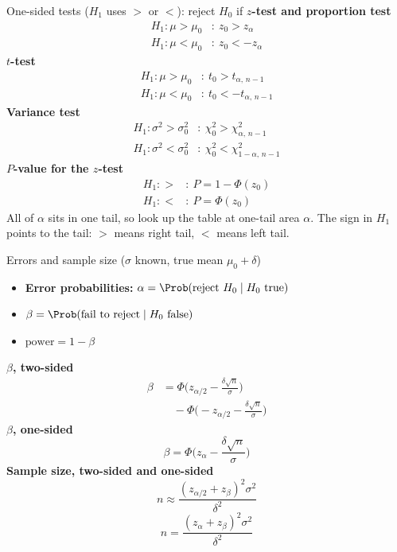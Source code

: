 \begin{formulabox}{One-sided tests ($H_1$ uses $>$ or $<$): reject $H_0$ if}
\textbf{$z$-test and proportion test}
\[ \begin{aligned} H_1:\mu>\mu_0&:\ z_0>z_\alpha\\ H_1:\mu<\mu_0&:\ z_0<-z_\alpha\end{aligned} \]
\textbf{$t$-test}
\[ \begin{aligned} H_1:\mu>\mu_0&:\ t_0>t_{\alpha,\,n-1}\\ H_1:\mu<\mu_0&:\ t_0<-t_{\alpha,\,n-1}\end{aligned} \]
\textbf{Variance test}
\[ \begin{aligned} H_1:\sigma^2>\sigma_0^2&:\ \chi_0^2>\chi^2_{\alpha,\,n-1}\\ H_1:\sigma^2<\sigma_0^2&:\ \chi_0^2<\chi^2_{1-\alpha,\,n-1}\end{aligned} \]
\textbf{$P$-value for the $z$-test}
\[ \begin{aligned} H_1:>&:\ P=1-\Phi(z_0)\\ H_1:<&:\ P=\Phi(z_0)\end{aligned} \]
All of $\alpha$ sits in one tail, so look up the table at one-tail area $\alpha$. The sign in $H_1$ points to the tail: $>$ means right tail, $<$ means left tail.
\end{formulabox}

\begin{formulabox}{Errors and sample size ($\sigma$ known, true mean $\mu_0+\delta$)}
\begin{itemize}
  \item \textbf{Error probabilities:} $\alpha=\Prob(\text{reject }H_0\mid H_0\text{ true})$
  \item $\beta=\Prob(\text{fail to reject}\mid H_0\text{ false})$
  \item $\text{power}=1-\beta$
\end{itemize}
\textbf{$\beta$, two-sided}
\[ \begin{aligned}\beta&=\Phi\!\Big(z_{\alpha/2}-\frac{\delta\sqrt n}{\sigma}\Big)\\&\quad-\Phi\!\Big(-z_{\alpha/2}-\frac{\delta\sqrt n}{\sigma}\Big)\end{aligned} \]
\textbf{$\beta$, one-sided}
\[ \beta=\Phi\!\Big(z_\alpha-\frac{\delta\sqrt n}{\sigma}\Big) \]
\textbf{Sample size, two-sided and one-sided}
\[ n\approx\frac{(z_{\alpha/2}+z_\beta)^2\sigma^2}{\delta^2} \]
\[ n=\frac{(z_\alpha+z_\beta)^2\sigma^2}{\delta^2} \]
\end{formulabox}


